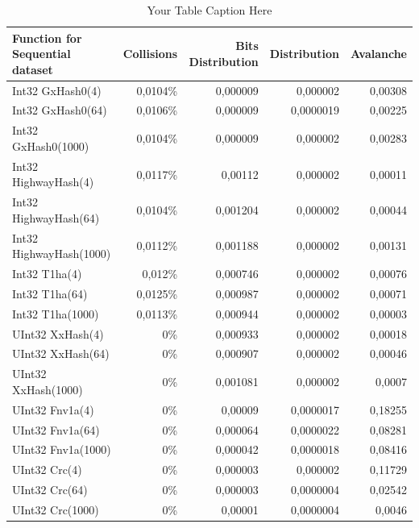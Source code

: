 \documentclass[10pt]{article}
\begin{document}
\begin{table}[H]
\centering
\begin{tabular}{|l|r|r|r|r|}
\hline
\textbf{Function for Sequential dataset} & \textbf{Collisions} & \textbf{Bits Distribution} & \textbf{Distribution} & \textbf{Avalanche} \\
\hline
Int32 GxHash0(4)                & 0,0104\% & 0,000009  & 0,000002 & 0,00308 \\
Int32 GxHash0(64)               & 0,0106\% & 0,000009  & 0,0000019 & 0,00225 \\
Int32 GxHash0(1000)             & 0,0104\% & 0,000009  & 0,000002 & 0,00283 \\
Int32 HighwayHash(4)            & 0,0117\% & 0,00112   & 0,000002 & 0,00011 \\
Int32 HighwayHash(64)           & 0,0104\% & 0,001204  & 0,000002 & 0,00044 \\
Int32 HighwayHash(1000)         & 0,0112\% & 0,001188  & 0,000002 & 0,00131 \\
Int32 T1ha(4)                   & 0,012\%  & 0,000746  & 0,000002 & 0,00076 \\
Int32 T1ha(64)                  & 0,0125\% & 0,000987  & 0,000002 & 0,00071 \\
Int32 T1ha(1000)                & 0,0113\% & 0,000944  & 0,000002 & 0,00003 \\
UInt32 XxHash(4)                & 0\%      & 0,000933  & 0,000002 & 0,00018 \\
UInt32 XxHash(64)               & 0\%      & 0,000907  & 0,000002 & 0,00046 \\
UInt32 XxHash(1000)             & 0\%      & 0,001081  & 0,000002 & 0,0007 \\
UInt32 Fnv1a(4)                 & 0\%      & 0,00009   & 0,0000017 & 0,18255 \\
UInt32 Fnv1a(64)                & 0\%      & 0,000064  & 0,0000022 & 0,08281 \\
UInt32 Fnv1a(1000)              & 0\%      & 0,000042  & 0,0000018 & 0,08416 \\
UInt32 Crc(4)                   & 0\%      & 0,000003  & 0,000002 & 0,11729 \\
UInt32 Crc(64)                  & 0\%      & 0,000003  & 0,0000004 & 0,02542 \\
UInt32 Crc(1000)                & 0\%      & 0,00001   & 0,0000004 & 0,0046 \\
\hline
\end{tabular}
\caption{Your Table Caption Here}
\label{tab:my_label}
\end{table}
\end{document}
